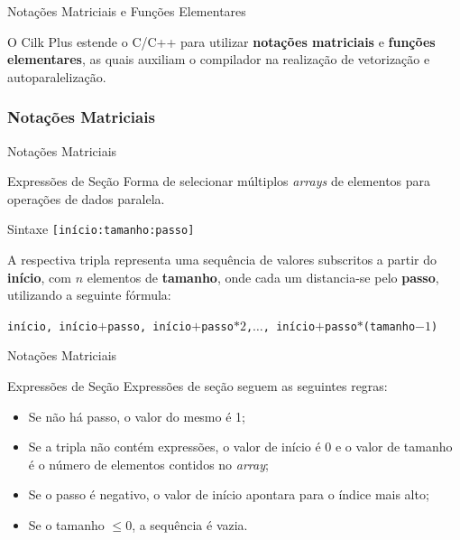 \documentclass{beamer}
\begin{document}
\begin{frame}{Notações Matriciais e Funções Elementares}
\begin{block}{}
\centering
    O Cilk Plus estende o C/C++ para utilizar \textbf{notações matriciais} e \textbf{funções 
    elementares}, as quais auxiliam o compilador na 
    realização de vetorização e autoparalelização.
\end{block}
\end{frame}

\subsubsection{Notações Matriciais}
\begin{frame}{Notações Matriciais}
\begin{block}{Expressões de Seção}
    Forma de selecionar múltiplos \textit{arrays} de elementos para operações de dados paralela.
\begin{block}{Sintaxe}
    \texttt{[início:tamanho:passo]}
\end{block}
    A respectiva tripla representa uma sequência de valores subscritos a partir 
    do \textbf{início}, com $n$ elementos de \textbf{tamanho}, onde cada um 
    distancia-se pelo \textbf{passo}, utilizando a seguinte fórmula:
\begin{block}{}
    \centering
\begin{small}
    \texttt{início, início$+$passo, início$+$passo$*2$,$\ldots$, início$+$passo$*$(tamanho$-1$)}
\end{small}
\end{block}
\end{block}

\end{frame}

\begin{frame}{Notações Matriciais}
\begin{block}{Expressões de Seção}
    Expressões de seção seguem as seguintes regras:
\begin{itemize}
    \item Se não há passo, o valor do mesmo é 1;
	\item Se a tripla não contém expressões, o valor de início é $0$ e o 
	valor de tamanho é o número de elementos contidos no \textit{array};
	\item Se o passo é negativo, o valor de início apontara para o índice mais alto;
	\item Se o tamanho $\leq 0$, a sequência é vazia.
\end{itemize}
\end{block}

\end{frame}
\end{document}
